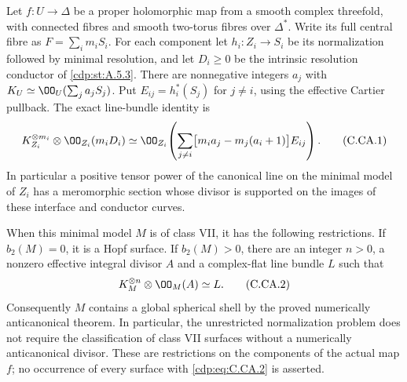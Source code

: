 \begin{proposition}\label{cdp:st:C.2.UN.17}

Let $f:U\to\Delta$ be a proper holomorphic map from a smooth
complex threefold, with connected fibres and smooth two-torus
fibres over $\Delta^*$. Write its full central fibre as
$F=\sum_i m_iS_i$. For each component let
$h_i:Z_i\to S_i$ be its normalization followed by minimal
resolution, and let $D_i\ge0$ be the intrinsic resolution
conductor of \ref{cdp:st:A.5.3}. There are nonnegative integers $a_j$ with
$K_U\simeq\OO_U(\sum_j a_jS_j)$. Put
$E_{ij}=h_i^*(S_j)$ for $j\ne i$, using the effective
Cartier pullback. The exact line-bundle identity is
\[
 K_{Z_i}^{\otimes m_i}\otimes\OO_{Z_i}(m_iD_i)
 \simeq
 \OO_{Z_i}\!\left(
  \sum_{j\ne i}\bigl[m_i a_j-m_j(a_i+1)\bigr]E_{ij}
 \right).                                                \tag{C.CA.1}\label{cdp:eq:C.CA.1}
\]
In particular a positive tensor power of the canonical line on the minimal
model of $Z_i$ has a meromorphic section whose divisor is
supported on the images of these interface and conductor
curves.

When this minimal model $M$ is of class VII, it has the
following restrictions. If $b_2(M)=0$, it is a Hopf surface.
If $b_2(M)>0$, there are an integer $n>0$, a nonzero
effective integral divisor $A$ and a complex-flat line
bundle $L$ such that
\[
                 K_M^{\otimes n}\otimes\OO_M(A)
                         \simeq L.                       \tag{C.CA.2}\label{cdp:eq:C.CA.2}
\]
Consequently $M$ contains a global spherical shell by the
proved numerically anticanonical theorem. In particular,
the unrestricted normalization problem does not require
the classification of class VII surfaces without a
numerically anticanonical divisor. These are restrictions
on the components of the actual map $f$; no occurrence of
every surface with \eqref{cdp:eq:C.CA.2} is asserted.
\end{proposition}

